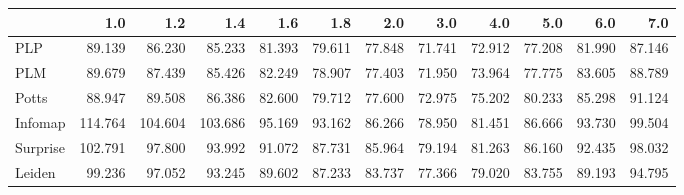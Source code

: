 \begin{tabular}{lrrrrrrrrrrr}
\toprule
{} &     1.0 &     1.2 &     1.4 &    1.6 &    1.8 &    2.0 &    3.0 &    4.0 &    5.0 &    6.0 &    7.0 \\
\midrule
PLP      &  89.139 &  86.230 &  85.233 & 81.393 & 79.611 & 77.848 & 71.741 & 72.912 & 77.208 & 81.990 & 87.146 \\
PLM      &  89.679 &  87.439 &  85.426 & 82.249 & 78.907 & 77.403 & 71.950 & 73.964 & 77.775 & 83.605 & 88.789 \\
Potts    &  88.947 &  89.508 &  86.386 & 82.600 & 79.712 & 77.600 & 72.975 & 75.202 & 80.233 & 85.298 & 91.124 \\
Infomap  & 114.764 & 104.604 & 103.686 & 95.169 & 93.162 & 86.266 & 78.950 & 81.451 & 86.666 & 93.730 & 99.504 \\
Surprise & 102.791 &  97.800 &  93.992 & 91.072 & 87.731 & 85.964 & 79.194 & 81.263 & 86.160 & 92.435 & 98.032 \\
Leiden   &  99.236 &  97.052 &  93.245 & 89.602 & 87.233 & 83.737 & 77.366 & 79.020 & 83.755 & 89.193 & 94.795 \\
\bottomrule
\end{tabular}

